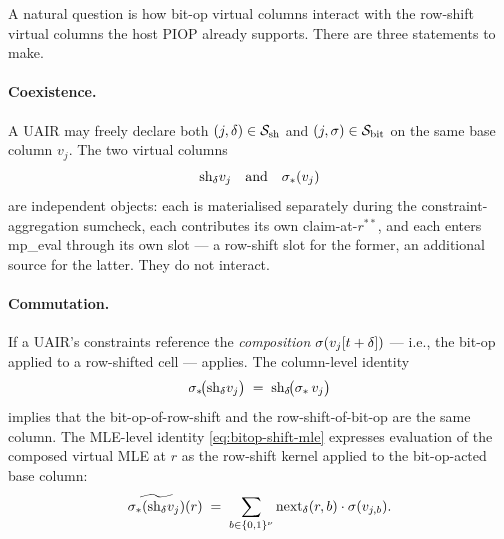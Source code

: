 A natural question is how bit-op virtual columns interact with the
row-shift virtual columns the host PIOP already supports. There are
three statements to make.

\paragraph{Coexistence.} A UAIR may freely declare both
$(j,\delta) \in \mathcal{S}_{\mathrm{sh}}$ and $(j,\sigma) \in \mathcal{S}_{\mathrm{bit}}$ on the same base
column $v_j$. The two virtual columns
\[
  \mathrm{sh}_{\delta} v_j \quad\text{and}\quad \sigma_*(v_j)
\]
are independent objects: each is materialised separately during the
constraint-aggregation sumcheck, each contributes its own claim-at-$r^{**}$,
and each enters mp\_eval through its own slot — a row-shift slot for
the former, an additional source for the latter. They do not interact.

\paragraph{Commutation.} If a UAIR's constraints reference the
\emph{composition} $\sigma(v_j[t+\delta])$ — i.e., the bit-op applied
to a row-shifted cell —  applies. The
column-level identity
\[
  \sigma_*\!\big(\mathrm{sh}_{\delta} v_j\big) \;=\; \mathrm{sh}_{\delta}\!\big(\sigma_*\, v_j\big)
\]
implies that the bit-op-of-row-shift and the row-shift-of-bit-op are
the same column. The MLE-level identity
\cref{eq:bitop-shift-mle} expresses evaluation of the composed virtual
MLE at $r$ as the row-shift kernel applied to the bit-op-acted base
column:
\[
  \widetilde{\sigma_*(\mathrm{sh}_{\delta} v_j)}(r) \;=\; \sum_{b \in \{0,1\}^\nu} \mathrm{next}_\delta(r, b) \cdot \sigma(v_{j,b}).
\]

